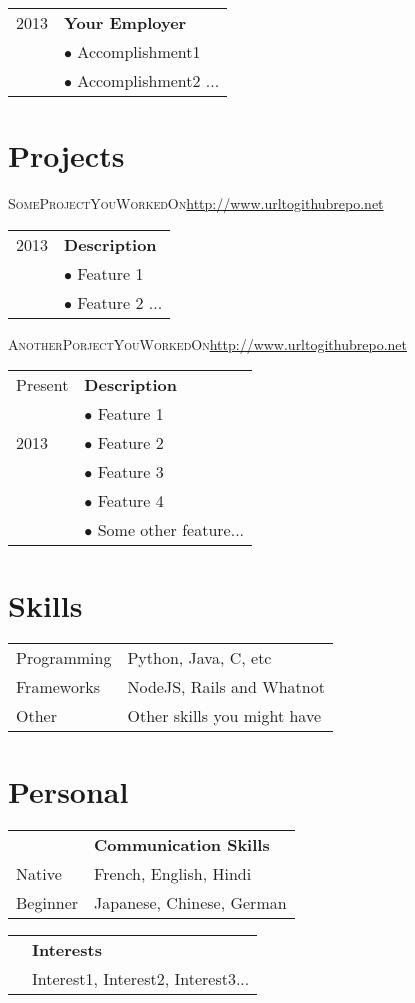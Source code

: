 \documentclass[10pt, letterpaper]{article}
\def\COL{2.1}
\begin{document}
\begin{tabular}{p{\COL cm}|l} 
  {\hfill 2013} & \textbf{Your Employer} \\
  {\hfill} & $\bullet$ Accomplishment1 \\
  {\hfill} & $\bullet$ Accomplishment2 ...
\end{tabular}
\medskip


\section*{Projects}
\noindent\enskip\textsc{SomeProjectYouWorkedOn}\hfill \url{http://www.urltogithubrepo.net}
\medskip

\begin{tabular}{p{\COL cm}|l} 
  {\hfill 2013} & \textbf{Description} \\
  {\hfill} & $\bullet$ Feature 1 \\
  {\hfill} & $\bullet$ Feature 2 ...
\end{tabular}
\medskip

\noindent\enskip\textsc{AnotherPorjectYouWorkedOn}\hfill \url{http://www.urltogithubrepo.net}
\medskip

\begin{tabular}{p{\COL cm}|l} 
  {\hfill Present} & \textbf{Description} \\
  {\hfill} & $\bullet$ Feature 1 \\
  {\hfill 2013} & $\bullet$ Feature 2 \\
  {\hfill} & $\bullet$ Feature 3 \\
  {\hfill} & $\bullet$ Feature 4 \\
  {\hfill} & $\bullet$ Some other feature...
\end{tabular}


\section*{Skills}
\indent
\indent
\begin{tabular}{p{\COL cm}|l}
  {\hfill Programming} & Python, Java, C, etc \\
  {\hfill Frameworks} & NodeJS, Rails and Whatnot \\
  {\hfill Other} & Other skills you might have
\end{tabular}


\section*{Personal}
\indent
\indent
\begin{tabular}{p{\COL cm}|l}
  \multicolumn{1}{l}{}&\multicolumn{1}{l}{\textbf{Communication Skills}} \\
  {\hfill Native}   & French, English, Hindi \\
  {\hfill Beginner} & Japanese, Chinese, German
\end{tabular}

\bigskip
\begin{tabular}{p{\COL cm}|l}
  \multicolumn{1}{l}{}&\multicolumn{1}{l}{\textbf{Interests}} \\
                      & Interest1, Interest2, Interest3...
\end{tabular}
\end{document}
